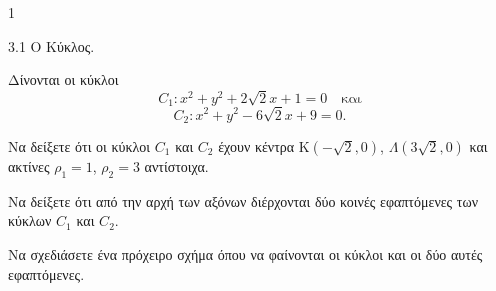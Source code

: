 \begin{ylh}{1}
    \item 3.1 Ο Κύκλος.
\end{ylh}
Δίνονται οι κύκλοι
\[
C_1 : x^2 + y^2 + 2\sqrt{2}x + 1 = 0 \quad \text{και}
\]
\[
C_2 : x^2 + y^2 - 6\sqrt{2}x + 9 = 0.
\]
\begin{alist}
\item Να δείξετε ότι οι κύκλοι $C_1$ και $C_2$ έχουν κέντρα $\mathrm{K}(-\sqrt{2},0)$, $\Lambda(3\sqrt{2},0)$ και ακτίνες $\rho_1=1$, $\rho_2=3$ αντίστοιχα. 
\item
    \begin{rlist}
    \item Να δείξετε ότι από την αρχή των αξόνων διέρχονται δύο κοινές εφαπτόμενες των κύκλων $C_1$ και $C_2$. 
    \item Να σχεδιάσετε ένα πρόχειρο σχήμα όπου να φαίνονται οι κύκλοι και οι δύο αυτές εφαπτόμενες. 
    \end{rlist}
\end{alist}